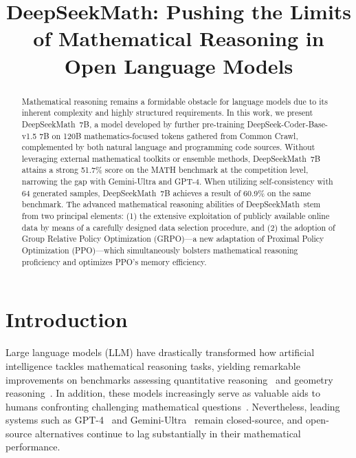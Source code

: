 \title{DeepSeekMath: Pushing the Limits of Mathematical Reasoning in Open Language Models}

\begin{abstract}
Mathematical reasoning remains a formidable obstacle for language models due to its inherent complexity and highly structured requirements. In this work, we present DeepSeekMath~7B, a model developed by further pre-training DeepSeek-Coder-Base-v1.5 7B on 120B mathematics-focused tokens gathered from Common Crawl, complemented by both natural language and programming code sources. Without leveraging external mathematical toolkits or ensemble methods, DeepSeekMath~7B attains a strong 51.7\% score on the MATH benchmark at the competition level, narrowing the gap with Gemini-Ultra and GPT-4. When utilizing self-consistency with 64 generated samples, DeepSeekMath~7B achieves a result of 60.9\% on the same benchmark. The advanced mathematical reasoning abilities of DeepSeekMath~stem from two principal elements: (1) the extensive exploitation of publicly available online data by means of a carefully designed data selection procedure, and (2) the adoption of Group Relative Policy Optimization (GRPO)—a new adaptation of Proximal Policy Optimization (PPO)—which simultaneously bolsters mathematical reasoning proficiency and optimizes PPO's memory efficiency.
\end{abstract}

\section{Introduction}

Large language models (LLM) have drastically transformed how artificial intelligence tackles mathematical reasoning tasks, yielding remarkable improvements on benchmarks assessing quantitative reasoning~\citep{MATH} and geometry reasoning~\citep{trinh2024solving}. In addition, these models increasingly serve as valuable aids to humans confronting challenging mathematical questions~\citep{tao}. Nevertheless, leading systems such as GPT-4~\citep{gpt4} and Gemini-Ultra~\citep{gemini} remain closed-source, and open-source alternatives continue to lag substantially in their mathematical performance.

